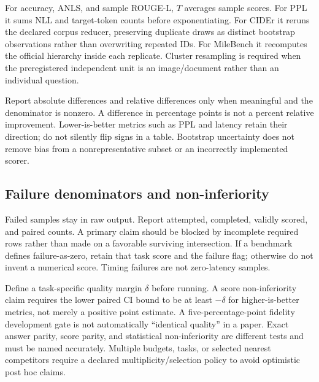 For accuracy, ANLS, and sample ROUGE-L, $T$ averages sample scores. For PPL it
sums NLL and target-token counts before exponentiating. For CIDEr it reruns the
declared corpus reducer, preserving duplicate draws as distinct bootstrap
observations rather than overwriting repeated IDs. For MileBench it recomputes
the official hierarchy inside each replicate. Cluster resampling is required
when the preregistered independent unit is an image/document rather than an
individual question.

Report absolute differences and relative differences only when meaningful and
the denominator is nonzero. A difference in percentage points is not a percent
relative improvement. Lower-is-better metrics such as PPL and latency retain
their direction; do not silently flip signs in a table. Bootstrap uncertainty
does not remove bias from a nonrepresentative subset or an incorrectly
implemented scorer.

\subsection{Failure denominators and non-inferiority}
Failed samples stay in raw output. Report attempted, completed, validly scored,
and paired counts. A primary claim should be blocked by incomplete required
rows rather than made on a favorable surviving intersection. If a benchmark
defines failure-as-zero, retain that task score and the failure flag; otherwise
do not invent a numerical score. Timing failures are not zero-latency samples.

Define a task-specific quality margin $\delta$ before running. A score
non-inferiority claim requires the lower paired CI bound to be at least
$-\delta$ for higher-is-better metrics, not merely a positive point estimate.
A five-percentage-point fidelity development gate is not automatically
``identical quality'' in a paper. Exact answer parity, score parity, and
statistical non-inferiority are different tests and must be named accurately.
Multiple budgets, tasks, or selected nearest competitors require a declared
multiplicity/selection policy to avoid optimistic post hoc claims.

